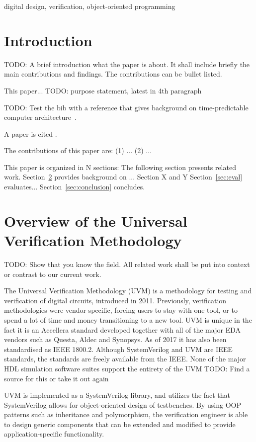 \documentclass[a4paper, conference]{IEEEtran}
\newcommand{\todo}[1]{{\color{olive} TODO: #1}}
\begin{document}
\begin{IEEEkeywords}
digital design, verification, object-oriented programming
\end{IEEEkeywords}


\section{Introduction}
\label{sec:intro}

\todo{A brief introduction what the paper is about. It shall include briefly the
main contributions and findings. The contributions can be bullet listed.}

This paper... \todo{purpose statement, latest in 4th paragraph}

\todo{Test the bib with a reference that gives background on time-predictable
computer architecture~\cite{tpca:jes}.}

A paper is cited \cite{paper:example}.

The contributions of this paper are: (1) ... (2) ...

This paper is organized in N sections: The following section presents related work.
Section~\ref{sec:related} provides background on ...
Section X and Y 
Section~\ref{sec:eval} evaluates...
Section~\ref{sec:conclusion} concludes.


\section{Overview of the Universal Verification Methodology}
\label{sec:related}

\todo{Show that you know the field. All related work shall be put
into context or contrast to our current work.}

The Universal Verification Methodology (UVM) is a methodology for testing and verification of digital circuits, introduced in 2011. Previously, verification methodologies were vendor-specific, forcing users to stay with one tool, or to spend a lot of time and money transitioning to a new tool. UVM is unique in the fact it is an Accellera standard developed together with all of the major EDA vendors such as Questa, Aldec and Synopsys. As of 2017 it has also been standardised as IEEE 1800.2. Although SystemVerilog and UVM are IEEE standards, the standards are freely available from the IEEE. None of the major HDL simulation software suites support the entirety of the UVM \todo{Find a source for this or take it out again}

UVM is implemented as a SystemVerilog library, and utilizes the fact that SystemVerilog allows for object-oriented design of testbenches. By using OOP patterns such as inheritance and polymorphism, the verification engineer is able to design generic components that can be extended and modified to provide application-specific functionality. 
\end{document}

